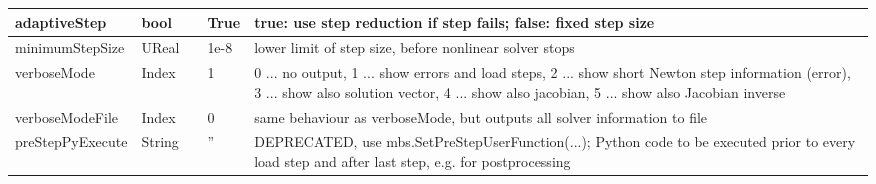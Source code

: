 \begin{center}
\begin{longtable}{| p{4.2cm} | p{2.5cm} | p{0.3cm} | p{3.0cm} | p{6cm} |}
    adaptiveStep &     bool &      &     True &     true: use step reduction if step fails; false: fixed step size\\ \hline
    minimumStepSize &     UReal &      &     1e-8 &     lower limit of step size, before nonlinear solver stops\\ \hline
    verboseMode &     Index &      &     1 &     0 ... no output, 1 ... show errors and load steps, 2 ... show short Newton step information (error), 3 ... show also solution vector, 4 ... show also jacobian, 5 ... show also Jacobian inverse\\ \hline
    verboseModeFile &     Index &      &     0 &     same behaviour as verboseMode, but outputs all solver information to file\\ \hline
    preStepPyExecute &     String &      &     '' &     DEPRECATED, use mbs.SetPreStepUserFunction(...); Python code to be executed prior to every load step and after last step, e.g. for postprocessing\\ \hline
	  \end{longtable}
	\end{center}

